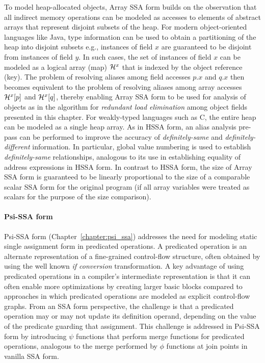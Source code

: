 To model heap-allocated objects, Array SSA form builds on the observation that all indirect memory operations can be modeled as accesses to elements of abstract arrays that represent disjoint subsets of the heap.  For modern object-oriented languages like Java, type information can be used to obtain a partitioning of the heap into disjoint subsets e.g.,  instances of field $x$ are guaranteed to be disjoint from instances of field $y$.  In such cases, the set of instances of field $x$ can be modeled as a logical array (map) ${\cal H}^x$ that is indexed by the object reference (key).  The problem of resolving aliases among field accesses $p.x$ and $q.x$ then becomes equivalent to the problem of resolving aliases among array accesses ${\cal H}^x[p]$ and ${\cal H}^x[q]$, thereby enabling Array SSA form to be used for analysis of objects as in the algorithm for {\em redundant load elimination} among object fields presented in this chapter.  For weakly-typed languages such as C, the entire heap can be modeled as a single heap array.  As in HSSA form, an alias analysis pre-pass can be performed to improve the accuracy of {\em definitely-same} and {\em definitely-different} information.  In particular, global value numbering is used to establish  {\em definitely-same} relationships, analogous to its use in establishing equality of address expressions in HSSA form.  In contrast to HSSA form, the size of Array SSA form is guaranteed to be linearly proportional to the size of a comparable scalar SSA form for the original program (if all array variables were treated as scalars for the purpose of the size comparison).

\paragraph{Psi-SSA form}

Psi-SSA form  (Chapter~\ref{chapter:psi_ssa}) addresses the need for modeling static single assignment form in predicated operations.  
A predicated operation is an alternate representation of a fine-grained control-flow structure, often obtained by using the well known {\em if conversion} transformation.  A key advantage of using predicated operations in a compiler's intermediate representation is that it can often enable more optimizations by creating larger basic blocks compared to approaches in which predicated operations are modeled as explicit control-flow graphs.  From an SSA form perspective, the challenge is that a predicated operation may or may not update its definition operand, depending on the value of the predicate guarding that assignment.  This challenge is addressed in Psi-SSA form by introducing $\psi$ functions that perform merge functions for predicated operations, analogous to the merge performed by $\phi$ functions at join points in vanilla SSA form.

